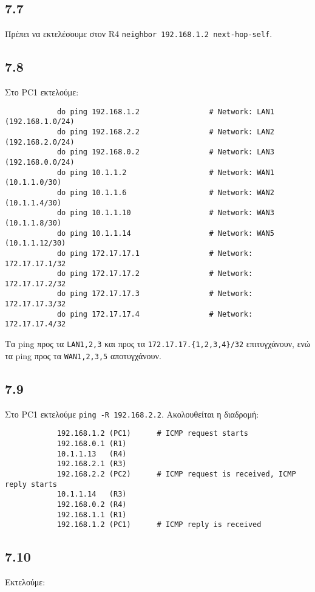 \documentclass[a4paper, 12pt]{article}
\begin{document}
	\subsection*{7.7}
		Πρέπει να εκτελέσουμε στον R4 \verb|neighbor 192.168.1.2 next-hop-self|.

	\subsection*{7.8}
		Στο PC1 εκτελούμε:
		
		\begin{verbatim}
			do ping 192.168.1.2                # Network: LAN1 (192.168.1.0/24)
			do ping 192.168.2.2                # Network: LAN2 (192.168.2.0/24)
			do ping 192.168.0.2                # Network: LAN3 (192.168.0.0/24)
			do ping 10.1.1.2                   # Network: WAN1 (10.1.1.0/30)
			do ping 10.1.1.6                   # Network: WAN2 (10.1.1.4/30)
			do ping 10.1.1.10                  # Network: WAN3 (10.1.1.8/30)
			do ping 10.1.1.14                  # Network: WAN5 (10.1.1.12/30)
			do ping 172.17.17.1                # Network: 172.17.17.1/32
			do ping 172.17.17.2                # Network: 172.17.17.2/32
			do ping 172.17.17.3                # Network: 172.17.17.3/32
			do ping 172.17.17.4                # Network: 172.17.17.4/32
		\end{verbatim}
		
		Τα ping προς τα \verb|LAN1,2,3| και προς τα \verb|172.17.17.{1,2,3,4}/32| επιτυγχάνουν, ενώ τα ping προς τα \verb|WAN1,2,3,5| αποτυγχάνουν.

	\subsection*{7.9}
		Στο PC1 εκτελούμε \verb|ping -R 192.168.2.2|. Ακολουθείται η διαδρομή:
		
		\begin{verbatim}
			192.168.1.2 (PC1)      # ICMP request starts 
			192.168.0.1 (R1)
			10.1.1.13   (R4)
			192.168.2.1 (R3)
			192.168.2.2 (PC2)      # ICMP request is received, ICMP reply starts
			10.1.1.14   (R3)
			192.168.0.2 (R4)
			192.168.1.1 (R1)
			192.168.1.2 (PC1)      # ICMP reply is received
		\end{verbatim}

	\subsection*{7.10}
		Εκτελούμε:
		
\end{document}
